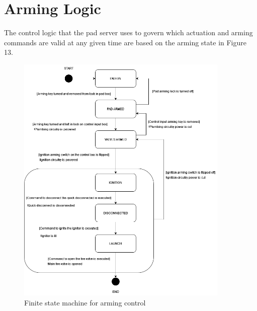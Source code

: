 \section{Arming Logic}

The control logic that the pad server uses to govern which actuation and arming commands are valid at any given time
are based on the arming state in Figure 13.

\begin{figure}[H]
    \centering
    \includegraphics[width=4in]{./assets/Hybrid_Control_FSM.png}
    \caption{Finite state machine for arming control}
    \label{fig:logging-fsm}
\end{figure}

